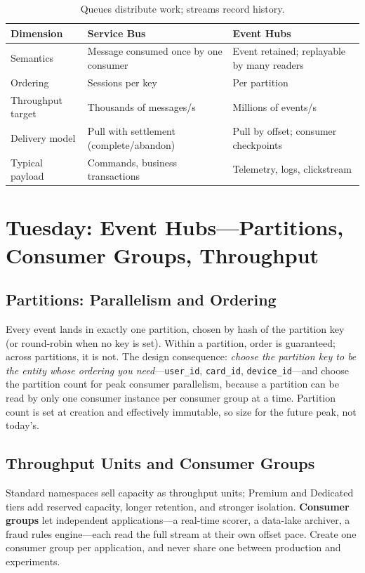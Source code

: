 \begin{table}[H]
\centering
\small
\begin{tabular}{@{}p{3.4cm}p{4.9cm}p{4.9cm}@{}}
\toprule
\textbf{Dimension} & \textbf{Service Bus} & \textbf{Event Hubs} \\
\midrule
Semantics & Message consumed once by one consumer & Event retained; replayable by many readers \\
Ordering & Sessions per key & Per partition \\
Throughput target & Thousands of messages/s & Millions of events/s \\
Delivery model & Pull with settlement (complete/abandon) & Pull by offset; consumer checkpoints \\
Typical payload & Commands, business transactions & Telemetry, logs, clickstream \\
\bottomrule
\end{tabular}
\caption{Queues distribute work; streams record history.}
\label{tab:ch13-sb-vs-eh}
\end{table}

\section{Tuesday: Event Hubs---Partitions, Consumer Groups, Throughput}

\subsection{Partitions: Parallelism and Ordering}
Every event lands in exactly one partition, chosen by hash of the partition key (or round-robin when no key is set). Within a partition, order is guaranteed; across partitions, it is not. The design consequence: \emph{choose the partition key to be the entity whose ordering you need}---\texttt{user\_id}, \texttt{card\_id}, \texttt{device\_id}---and choose the partition count for peak consumer parallelism, because a partition can be read by only one consumer instance per consumer group at a time. Partition count is set at creation and effectively immutable, so size for the future peak, not today's.

\subsection{Throughput Units and Consumer Groups}
Standard namespaces sell capacity as throughput units; Premium and Dedicated tiers add reserved capacity, longer retention, and stronger isolation. \textbf{Consumer groups} let independent applications---a real-time scorer, a data-lake archiver, a fraud rules engine---each read the full stream at their own offset pace. Create one consumer group per application, and never share one between production and experiments.

